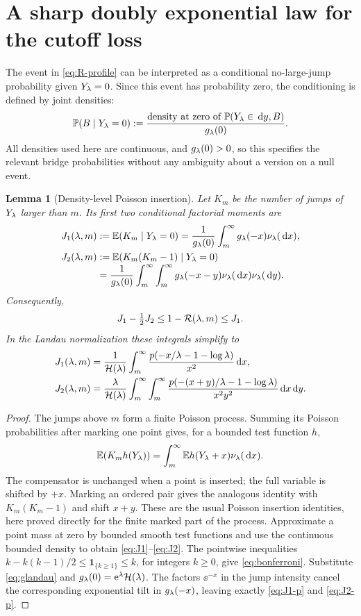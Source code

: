 \documentclass[11pt,a4paper]{article}
\numberwithin{equation}{section}
\newtheorem{lemma}[theorem]{Lemma}
\theoremstyle{definition}
\theoremstyle{remark}
\newcommand{\dd}{\,\mathrm d}\newcommand{\ii}{\mathrm i}
\newcommand{\HH}{\mathcal H}\newcommand{\RR}{\mathcal R}
\begin{document}
\section{A sharp doubly exponential law for the cutoff loss}
\label{sec:double}
The event in \eqref{eq:R-profile} can be interpreted as a conditional
no-large-jump probability given \(Y_\lambda=0\). Since this event has
probability zero, the conditioning is defined by joint densities:
\[
 \Prob(B\mid Y_\la=0)
 :=\frac{\text{density at zero of }\Prob(Y_\la\in\dd y, B)}{g_\la(0)}.
\]
All densities used here are continuous, and \(g_\lambda(0)>0\), so this
specifies the relevant bridge probabilities without any ambiguity about
a version on a null event.

\begin{lemma}[Density-level Poisson insertion]\label{lem:palm}
Let \(K_m\) be the number of jumps of \(Y_\lambda\) larger than \(m\).
Its first two conditional factorial moments are
\begin{align}
 J_1(\la,m)&:=\E(K_m\mid Y_\la=0)
  =\frac1{g_\la(0)}\int_m^\infty g_\la(-x)\nu_\la(\dd x),
 \label{eq:J1}\\
 J_2(\la,m)&:=\E(K_m(K_m-1)\mid Y_\la=0)
 \notag\\[-3pt]
 &=\frac1{g_\la(0)}\int_m^\infty\int_m^\infty
                   g_\la(-x-y)\nu_\la(\dd x)\nu_\la(\dd y).
 \label{eq:J2}
\end{align}
Consequently,
\begin{equation}\label{eq:bonferroni}
 J_1-\tfrac12J_2\le1-\RR(\la,m)\le J_1.
\end{equation}
In the Landau normalization these integrals simplify to
\begin{align}
 J_1(\la,m)&=\frac1{\HH(\la)}\int_m^\infty
 \frac{p(-x/\la-1-\log\la)}{x^2}\dd x,\label{eq:J1-p}\\
 J_2(\la,m)&=\frac\la{\HH(\la)}\int_m^\infty\int_m^\infty
 \frac{p(-(x+y)/\la-1-\log\la)}{x^2y^2}\dd x\dd y.
 \label{eq:J2-p}
\end{align}
\end{lemma}
\begin{proof}
The jumps above \(m\) form a finite Poisson process. Summing its Poisson
probabilities after marking one point gives, for a bounded test function
\(h\),
\[
 \E(K_m h(Y_\la))=\int_m^\infty\E h(Y_\la+x)\nu_\la(\dd x).
\]
The compensator is unchanged when a point is inserted; the full variable
is shifted by \(+x\). Marking an ordered pair gives the analogous
identity with \(K_m(K_m-1)\) and shift \(x+y\). These are the usual
Poisson insertion identities, here proved directly for the finite
marked part of the process. Approximate a point mass at zero by bounded
smooth test functions and use the continuous bounded density to obtain
\eqref{eq:J1}--\eqref{eq:J2}.
The pointwise inequalities
\(k-k(k-1)/2\le\mathbf1_{\{k\ge1\}}\le k\), for integers \(k\ge0\),
give \eqref{eq:bonferroni}. Substitute \eqref{eq:glandau} and
\(g_\la(0)=\ee^\la\HH(\la)\). The factors \(\ee^{-x}\) in the jump
intensity cancel the corresponding exponential tilt in \(g_\lambda(-x)\),
leaving exactly \eqref{eq:J1-p} and \eqref{eq:J2-p}.
\end{proof}
\end{document}
